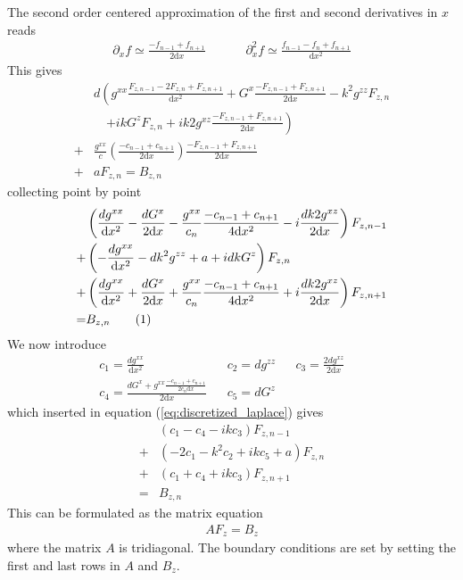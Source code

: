 \documentclass[12pt]{article}
\def\L{\left}
\def\R{\right}
\newcommand\numberthis{\addtocounter{equation}{1}\tag{\theequation}}
\begin{document}
The second order centered approximation of the first and second derivatives in
$x$ reads
%
\begin{align*}
    &&\partial_x f \simeq \frac{-f_{n-1} + f_{n+1}}{2\text{d}x}&&
    &&\partial_x^2 f \simeq \frac{f_{n-1} - f_{n} + f_{n+1}}{\text{d}x^2}&&
\end{align*}
%
This gives
%
\begin{align*}
    \, &d \L(    g^{xx} \frac{F_{z,n-1} - 2F_{z,n} + F_{z, n+1}}{\text{d}x^2} +
    G^x \frac{-F_{z,n-1} + F_{z,n+1}}{2\text{d}x} - k^2 g^{zz}F_{z,n} \R.\\
    &\quad\L.  + i kG^zF_{z,n} + i k2g^{xz} \frac{-F_{z,n-1} +
F_{z,n+1}}{2\text{d}x} \R) \\
%
    +& \frac{g^{xx}}{c} \L( \frac{-c_{n-1} + c_{n+1}}{2\text{d}x} \R)
\frac{-F_{z,n-1} + F_{z,n+1}}{2\text{d}x} \\
%
    +& aF_{z,n} = B_{z,n}
\end{align*}
%
collecting point by point
%
\begin{align*}
    &\L( \frac{dg^{xx}}{\text{d}x^2} - \frac{dG^x}{2\text{d}x} -
    \frac{g^{xx}}{c_{n}} \frac{-c_{n-1} + c_{n+1}}{4\text{d}x^2} - i\frac{d
    k2g^{xz}}{2\text{d}x} \R) F_{z,n-1} \\
    +&\L( - \frac{ dg^{xx} }{\text{d}x^2} - dk^2 g^{zz} + a + idkG^z \R) F_{z,n}
    \\
    +&\L( \frac{dg^{xx}}{\text{d}x^2} + \frac{dG^x}{2\text{d}x} +
    \frac{g^{xx}}{c_{n}} \frac{-c_{n-1} + c_{n+1}}{4\text{d}x^2} +
    i\frac{dk2g^{xz}}{2\text{d}x} \R) F_{z, n+1} \\
%
     =& B_{z,n} \numberthis
    \label{eq:discretized_laplace}
\end{align*}
%
We now introduce
%
\begin{align*}
    &c_1 = \frac{dg^{xx}}{\text{d}x^2}& &c_2 = dg^{zz}& &c_3 =
    \frac{2dg^{xz}}{2\text{d}x}& && \\ &c_4 = \frac{dG^x + g^{xx}\frac{-c_{n-1}
    + c_{n+1}}{2c_n\text{d}x}}{2\text{d}x}& &c_5 = dG^z& &&
\end{align*}
%
which inserted in equation (\ref{eq:discretized_laplace}) gives
%
\begin{align*}
    &\L( c_1 - c_4 -ikc_3 \R) F_{z,n-1} \\
    +&\L( -2c_1 - k^2c_2 +ikc_5 + a \R) F_{z,n} \\
    +&\L( c_1 + c_4 + ikc_3 \R) F_{z, n+1} \\
%
     =& B_{z,n}
\end{align*}
%
This can be formulated as the matrix equation
%
\begin{align*}
    AF_z=B_z
\end{align*}
%
where the matrix $A$ is tridiagonal. The boundary conditions are set by setting
the first and last rows in $A$ and $B_z$.
%
\end{document}
